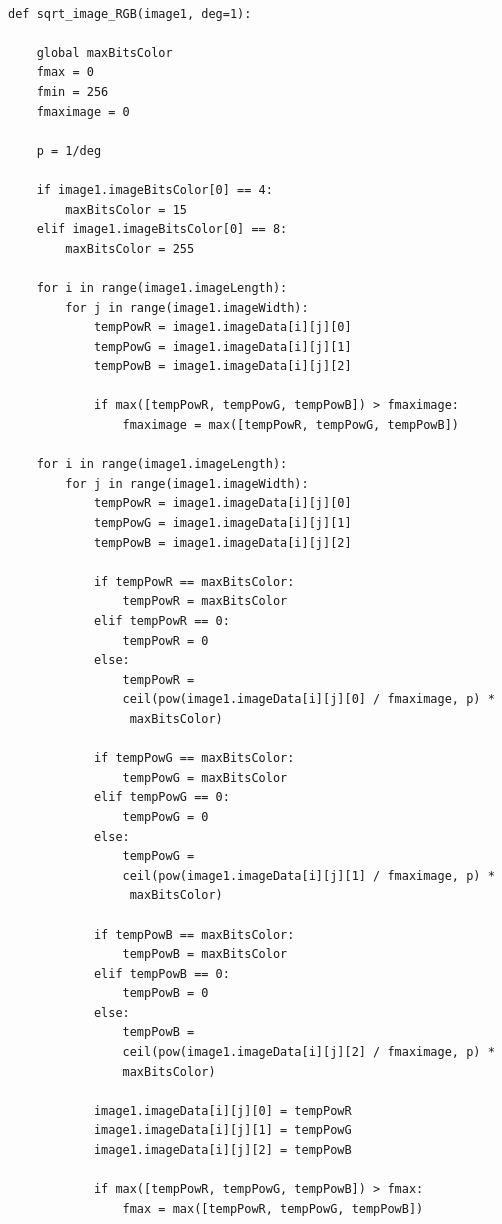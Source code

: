 \documentclass[magisterska,openany]{pracadypl}
\begin{document}
\lstset{language=Python}
\vspace{0.25cm}
\begin{lstlisting}[caption={Pierwiastkowanie obrazu}]

def sqrt_image_RGB(image1, deg=1):

    global maxBitsColor
    fmax = 0
    fmin = 256
    fmaximage = 0

    p = 1/deg

    if image1.imageBitsColor[0] == 4:
        maxBitsColor = 15
    elif image1.imageBitsColor[0] == 8:
        maxBitsColor = 255

    for i in range(image1.imageLength):
        for j in range(image1.imageWidth):
            tempPowR = image1.imageData[i][j][0]
            tempPowG = image1.imageData[i][j][1]
            tempPowB = image1.imageData[i][j][2]

            if max([tempPowR, tempPowG, tempPowB]) > fmaximage:
                fmaximage = max([tempPowR, tempPowG, tempPowB])

    for i in range(image1.imageLength):
        for j in range(image1.imageWidth):
            tempPowR = image1.imageData[i][j][0]
            tempPowG = image1.imageData[i][j][1]
            tempPowB = image1.imageData[i][j][2]

            if tempPowR == maxBitsColor:
                tempPowR = maxBitsColor
            elif tempPowR == 0:
                tempPowR = 0
            else:
                tempPowR = 
                ceil(pow(image1.imageData[i][j][0] / fmaximage, p) *
                 maxBitsColor)

            if tempPowG == maxBitsColor:
                tempPowG = maxBitsColor
            elif tempPowG == 0:
                tempPowG = 0
            else:
                tempPowG = 
                ceil(pow(image1.imageData[i][j][1] / fmaximage, p) *
                 maxBitsColor)

            if tempPowB == maxBitsColor:
                tempPowB = maxBitsColor
            elif tempPowB == 0:
                tempPowB = 0
            else:
                tempPowB = 
                ceil(pow(image1.imageData[i][j][2] / fmaximage, p) * 
                maxBitsColor)

            image1.imageData[i][j][0] = tempPowR
            image1.imageData[i][j][1] = tempPowG
            image1.imageData[i][j][2] = tempPowB

            if max([tempPowR, tempPowG, tempPowB]) > fmax:
                fmax = max([tempPowR, tempPowG, tempPowB])


\end{lstlisting}
\end{document}
